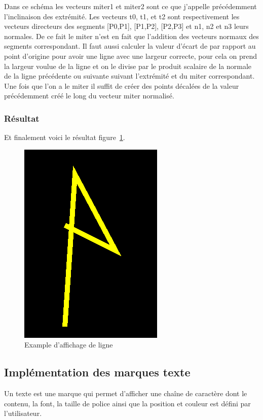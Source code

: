 \documentclass[12pt]{article}
\begin{document}
Dans ce schéma les vecteurs miter1 et miter2 sont ce que j’appelle précédemment l’inclinaison des extrémité. Les vecteurs t0, t1, et t2 sont respectivement les vecteurs directeurs des segments [P0,P1], [P1,P2], [P2,P3] et n1, n2 et n3 leurs normales. De ce fait le miter n’est en fait que l’addition des vecteurs normaux des segments correspondant. Il faut aussi calculer la valeur d’écart de par rapport au point d’origine pour avoir une ligne avec une largeur correcte, pour cela on prend la largeur voulue de la ligne et on le divise par le produit scalaire de la normale de la ligne précédente ou suivante suivant l’extrémité et du miter correspondant. Une fois que l’on a le miter il suffit de créer des points décalées de la valeur précédemment créé le long du vecteur miter normalisé.

\subsubsection{Résultat}
Et finalement voici le résultat figure~\ref{fig:line}.
\begin{figure}[htp]
  \centering
  \includegraphics[scale=0.8]{images/line_example}
  \caption{Example d'affichage de ligne}
  \label{fig:line}
\end{figure}


\subsection{Implémentation des marques texte}
Un texte est une marque qui permet d'afficher une chaîne de caractère dont le contenu, la font, la taille de police ainsi que la position et couleur est défini par l'utilisateur.
\end{document}

